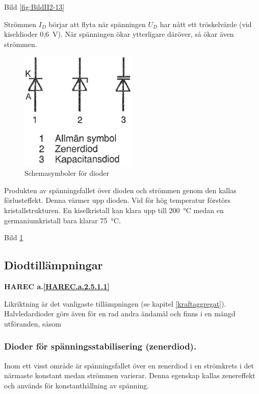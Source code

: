 Bild \ref{fig:BildII2-13}

Strömmen \(I_D\) börjar att flyta när spänningen \(U_D\) har nått ett
tröskelvärde (vid kiseldioder 0,6~V). När spänningen ökar ytterligare däröver,
så ökar även strömmen.

\begin{figure}
\includegraphics[width=0.5\textwidth]{images/cropped_pdfs/bild_2_2-14.pdf}
\caption{Schemasymboler för dioder}
\label{fig:BildII2-14}
\end{figure}

Produkten av spänningsfallet över dioden och strömmen genom den kallas
förlusteffekt. Denna värmer upp dioden. Vid för hög temperatur förstörs
kristallstrukturen. En kiselkristall kan klara upp till 200~°C medan en
germaniumkristall bara klarar 75~°C.

Bild \ref{fig:BildII2-14}

\subsection{Diodtillämpningar}
\textbf{HAREC a.\ref{HAREC.a.2.5.1.1}\label{myHAREC.a.2.5.1.1}}

Likriktning är det vanligaste tillämpningen (se kapitel \ref{kraftaggregat}).
Halvledardioder görs även för en rad andra ändamål och finns i en mängd
utföranden, såsom

\subsubsection{Dioder för spänningsstabilisering (zenerdiod).}

  Inom ett visst område är spänningsfallet över en zenerdiod i en strömkrets
  i det närmaste konstant medan strömmen varierar. Denna egenskap kallas
  zenereffekt och används för konstanthållning av spänning.

